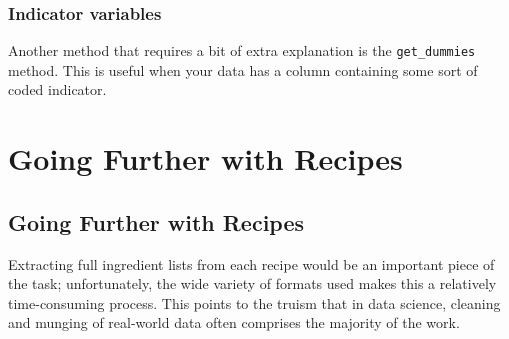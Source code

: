 \subsubsection*{Indicator variables}
Another method that requires a bit of extra explanation is the \verb|get_dummies| method.
This is useful when your data has a column containing some sort of coded indicator.

\section{Going Further with Recipes}
\subsection*{Going Further with Recipes}
Extracting full ingredient lists from each recipe would be an important piece of the
task; unfortunately, the wide variety of formats used makes this a relatively time-consuming process. This points to the truism that in data science, cleaning and
munging of real-world data often comprises the majority of the work.